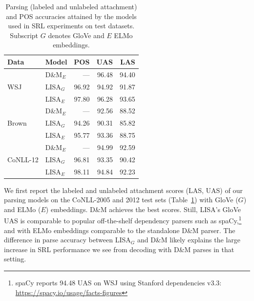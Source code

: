 \documentclass[11pt,a4paper]{article}
\begin{document}
\begin{table}
\begin{tabular}{llrrr} 		
Data & Model & POS & UAS & LAS \\ \hline \hline
\multirow{3}{*}{WSJ} & D\&M$_{E}$ & --- & 96.48 & 94.40 \\
& LISA$_{G}$ & 96.92 & 94.92 & 91.87 \\ 
& LISA$_{E}$ & 97.80 & 96.28 & 93.65 \\ \hline
\multirow{3}{*}{Brown} & D\&M$_{E}$ & --- & 92.56 & 88.52 \\
& LISA$_{G}$ & 94.26 & 90.31 & 85.82 \\ 
& LISA$_{E}$ & 95.77 & 93.36 & 88.75 \\ \hline
\multirow{3}{*}{CoNLL-12} & D\&M$_{E}$ & --- & 94.99 & 92.59 \\
& LISA$_{G}$ & 96.81 & 93.35 & 90.42 \\
& LISA$_{E}$ & 98.11 & 94.84 & 92.23 \\
\end{tabular}
\caption{\label{parsing-numbers} Parsing (labeled and unlabeled attachment) and POS accuracies attained by the models used in SRL experiments on test datasets. Subscript $G$ denotes GloVe and $E$ ELMo embeddings.}
\end{table}

We first report the labeled and unlabeled attachment scores (LAS, UAS) of our parsing models on the CoNLL-2005 and 2012 test sets (Table~\ref{parsing-numbers}) with GloVe ($G$) and ELMo ($E$) embeddings. D\&M achieves the best scores. Still, LISA's GloVe UAS is comparable to popular off-the-shelf dependency parsers such as spaCy,\footnote{spaCy reports 94.48 UAS on WSJ using Stanford dependencies v3.3: \protect\url{https://spacy.io/usage/facts-figures}} and with ELMo embeddings comparable to the standalone D\&M parser. The difference in parse accuracy between LISA$_G$ and D\&M likely explains the large increase in SRL performance we see from decoding with D\&M parses in that setting.
\end{document}
